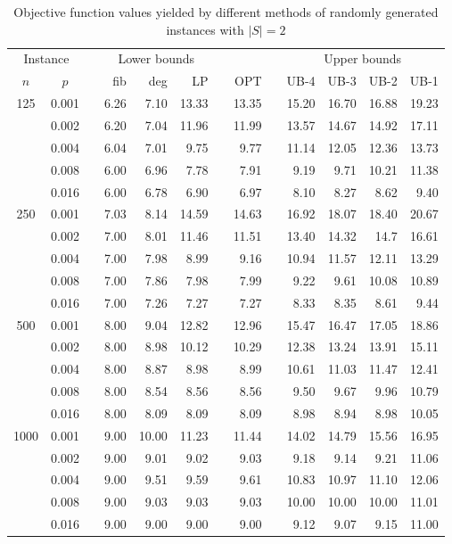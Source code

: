 \begin{table}[]
\centering
\begin{tabular}{ccrrrrrrrrrrr}
\multicolumn{2}{c}{Instance} & &\multicolumn{3}{c}{Lower bounds} & & & &\multicolumn{4}{c}{Upper bounds} \\
\cline{1-2}\cline{4-6}\cline{10-13}
$n$ & $p$  &   & fib  & deg  & LP  &  & OPT & & UB-4  & UB-3  & UB-2  & UB-1  \\
\hline
\multirow{5}{*}{125} 
& 0.001 && 6.26 & 7.10 & 13.33 && 13.35 && 15.20 & 16.70 & 16.88 & 19.23 \\
& 0.002 && 6.20 & 7.04 & 11.96 && 11.99 && 13.57 & 14.67 & 14.92 & 17.11 \\
& 0.004 && 6.04 & 7.01 & 9.75  && 9.77  && 11.14 & 12.05 & 12.36 & 13.73 \\
& 0.008 && 6.00 & 6.96 & 7.78  && 7.91  && 9.19  & 9.71  & 10.21 & 11.38 \\
& 0.016 && 6.00 & 6.78 & 6.90  && 6.97  && 8.10  & 8.27  & 8.62  & 9.40  \\
\hline
\multirow{5}{*}{250} 
& 0.001 && 7.03 & 8.14 & 14.59 && 14.63 && 16.92 & 18.07 & 18.40 & 20.67 \\
& 0.002 && 7.00 & 8.01 & 11.46 && 11.51 && 13.40 & 14.32 & 14.7  & 16.61 \\
& 0.004 && 7.00 & 7.98 & 8.99  && 9.16  && 10.94 & 11.57 & 12.11 & 13.29 \\
& 0.008 && 7.00 & 7.86 & 7.98  && 7.99  && 9.22  & 9.61  & 10.08 & 10.89 \\
& 0.016 && 7.00 & 7.26 & 7.27  && 7.27  && 8.33  & 8.35  & 8.61  & 9.44  \\
\hline
\multirow{5}{*}{500} 
& 0.001 && 8.00 & 9.04 & 12.82 &&12.96  &&15.47  & 16.47 & 17.05 & 18.86 \\
& 0.002 && 8.00 & 8.98 & 10.12 &&10.29  &&12.38  & 13.24 & 13.91 & 15.11 \\
& 0.004 && 8.00 & 8.87 & 8.98  &&8.99   &&10.61  & 11.03 & 11.47 & 12.41 \\
& 0.008 && 8.00 & 8.54 & 8.56  &&8.56   &&9.50   & 9.67  & 9.96  & 10.79 \\
& 0.016 && 8.00 & 8.09 & 8.09  &&8.09   &&8.98   & 8.94  & 8.98  & 10.05 \\
\hline
\multirow{5}{*}{1000} 
& 0.001 && 9.00 & 10.00 & 11.23 && 11.44 && 14.02 & 14.79 & 15.56 & 16.95 \\
& 0.002 && 9.00 & 9.01  & 9.02  && 9.03  && 9.18  & 9.14  & 9.21  & 11.06 \\
& 0.004 && 9.00 & 9.51  & 9.59  && 9.61  && 10.83 & 10.97 & 11.10 & 12.06 \\
& 0.008 && 9.00 & 9.03  & 9.03  && 9.03  && 10.00 & 10.00 & 10.00 & 11.01 \\
& 0.016 && 9.00 & 9.00  & 9.00  && 9.00  && 9.12  & 9.07  & 9.15  & 11.00 \\
\end{tabular}
\caption{Objective function values yielded by different methods of randomly generated instances with $|S|=2$}
\label{tab:obj-s2}
\end{table}

